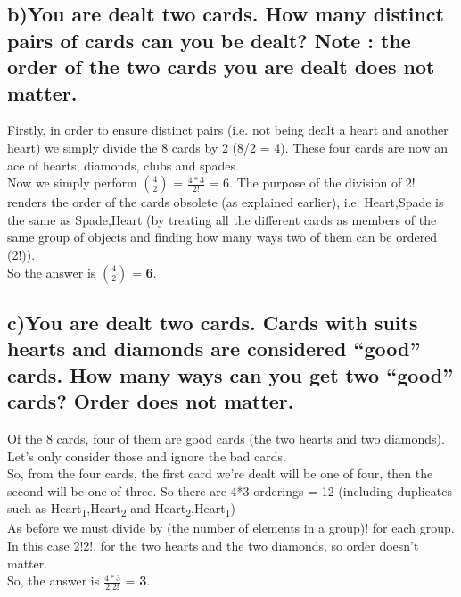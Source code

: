 \documentclass{report}
\begin{document}
		\subsection*{b)You are dealt two cards. How many distinct pairs of cards can you be dealt? Note : the order of the two cards you are dealt does not matter.}
		Firstly, in order to ensure distinct pairs (i.e. not being dealt a heart and another heart) we simply divide the 8 cards by 2 (8/2 = 4). These four cards are now an ace of hearts, diamonds, clubs and spades.\\Now we simply perform ${4 \choose 2}$ = $\frac{4*3}{2!}$ = 6. The purpose of the division of 2! renders the order of the cards obsolete (as explained earlier), i.e. Heart,Spade is the same as Spade,Heart (by treating all the different cards as members of the same group of objects and finding how many ways two of them can be ordered (2!)).\\
		So the answer is ${4 \choose 2}$ = \textbf{6}.
		\subsection*{c)You are dealt two cards. Cards with suits hearts and diamonds are considered “good” cards. How many ways can you get two “good” cards? Order does not matter.}
		Of the 8 cards, four of them are good cards (the two hearts and two diamonds). Let's only consider those and ignore the bad cards.\\
		So, from the four cards, the first card we're dealt will be one of four, then the second will be one of three. So there are 4*3 orderings = 12 (including duplicates such as Heart\textsubscript{1},Heart\textsubscript{2} and Heart\textsubscript{2},Heart\textsubscript{1})\\
		As before we must divide by (the number of elements in a group)! for each group. In this case 2!2!, for the two hearts and the two diamonds, so order doesn't matter.\\
		So, the answer is $\frac{4*3}{2!2!}$ = \textbf{3}. 
		
		
		
		
\end{document}
